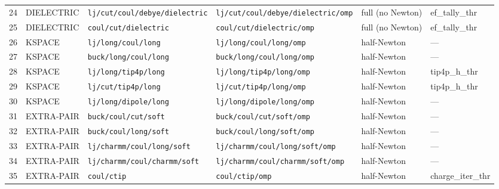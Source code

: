 \documentclass[
  11pt,
]{article}
\begin{document}
\begin{landscape}
\begin{longtable}{r l p{4.8cm} p{5.4cm} l p{3.2cm}}
24 & DIELECTRIC & \nolinkurl{lj/cut/coul/debye/dielectric}  & \nolinkurl{lj/cut/coul/debye/dielectric/omp}  & full (no Newton) & ef\_tally\_thr       \\
25 & DIELECTRIC & \nolinkurl{coul/cut/dielectric}           & \nolinkurl{coul/cut/dielectric/omp}           & full (no Newton) & ef\_tally\_thr       \\
26 & KSPACE     & \nolinkurl{lj/long/coul/long}             & \nolinkurl{lj/long/coul/long/omp}             & half-Newton      & ---                  \\
27 & KSPACE     & \nolinkurl{buck/long/coul/long}           & \nolinkurl{buck/long/coul/long/omp}           & half-Newton      & ---                  \\
28 & KSPACE     & \nolinkurl{lj/long/tip4p/long}            & \nolinkurl{lj/long/tip4p/long/omp}            & half-Newton      & tip4p\_h\_thr        \\
29 & KSPACE     & \nolinkurl{lj/cut/tip4p/long}             & \nolinkurl{lj/cut/tip4p/long/omp}             & half-Newton      & tip4p\_h\_thr        \\
30 & KSPACE     & \nolinkurl{lj/long/dipole/long}           & \nolinkurl{lj/long/dipole/long/omp}           & half-Newton      & ---                  \\
31 & EXTRA-PAIR & \nolinkurl{buck/coul/cut/soft}            & \nolinkurl{buck/coul/cut/soft/omp}            & half-Newton      & ---                  \\
32 & EXTRA-PAIR & \nolinkurl{buck/coul/long/soft}           & \nolinkurl{buck/coul/long/soft/omp}           & half-Newton      & ---                  \\
33 & EXTRA-PAIR & \nolinkurl{lj/charmm/coul/long/soft}      & \nolinkurl{lj/charmm/coul/long/soft/omp}      & half-Newton      & ---                  \\
34 & EXTRA-PAIR & \nolinkurl{lj/charmm/coul/charmm/soft}    & \nolinkurl{lj/charmm/coul/charmm/soft/omp}    & half-Newton      & ---                  \\
35 & EXTRA-PAIR & \nolinkurl{coul/ctip}                     & \nolinkurl{coul/ctip/omp}                     & half-Newton      & charge\_iter\_thr    \\
\end{longtable}
\endgroup
\end{landscape}
\end{document}
